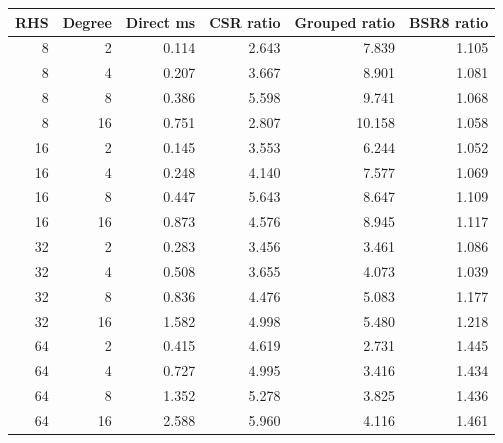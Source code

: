 \begin{tabular}{rrrrrr}
\toprule
RHS & Degree & Direct ms & CSR ratio & Grouped ratio & BSR8 ratio \\
\midrule
8 & 2 & 0.114 & 2.643 & 7.839 & 1.105 \\
8 & 4 & 0.207 & 3.667 & 8.901 & 1.081 \\
8 & 8 & 0.386 & 5.598 & 9.741 & 1.068 \\
8 & 16 & 0.751 & 2.807 & 10.158 & 1.058 \\
16 & 2 & 0.145 & 3.553 & 6.244 & 1.052 \\
16 & 4 & 0.248 & 4.140 & 7.577 & 1.069 \\
16 & 8 & 0.447 & 5.643 & 8.647 & 1.109 \\
16 & 16 & 0.873 & 4.576 & 8.945 & 1.117 \\
32 & 2 & 0.283 & 3.456 & 3.461 & 1.086 \\
32 & 4 & 0.508 & 3.655 & 4.073 & 1.039 \\
32 & 8 & 0.836 & 4.476 & 5.083 & 1.177 \\
32 & 16 & 1.582 & 4.998 & 5.480 & 1.218 \\
64 & 2 & 0.415 & 4.619 & 2.731 & 1.445 \\
64 & 4 & 0.727 & 4.995 & 3.416 & 1.434 \\
64 & 8 & 1.352 & 5.278 & 3.825 & 1.436 \\
64 & 16 & 2.588 & 5.960 & 4.116 & 1.461 \\
\bottomrule
\end{tabular}
